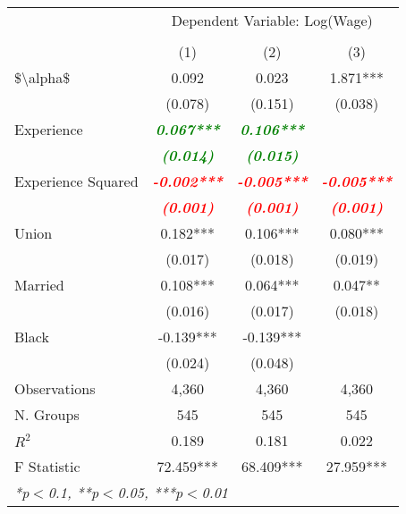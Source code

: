 

\begin{table}[!ht]
  \centering
\begin{tabular}{lccc}
  \toprule
  \toprule
  & \multicolumn{3}{c}{Dependent Variable: Log(Wage)} \\
  \cmidrule(lr){2-4} \\
   &   (1) & (2) & (3)\\
  \midrule
  \$\textbackslash alpha\$ & 0.092 & 0.023 & 1.871*** \\
   & (0.078) & (0.151) & (0.038) \\
  Experience & \textbf{\textit{\textcolor{green}{ 0.067***}}} & \textbf{\textit{\textcolor{green}{ 0.106***}}} &  \\
   & \textbf{\textit{\textcolor{green}{(0.014)}}} & \textbf{\textit{\textcolor{green}{(0.015)}}} &  \\
  Experience Squared & \textbf{\textit{\textcolor{red}{-0.002***}}} & \textbf{\textit{\textcolor{red}{-0.005***}}} & \textbf{\textit{\textcolor{red}{-0.005***}}} \\
   & \textbf{\textit{\textcolor{red}{(0.001)}}} & \textbf{\textit{\textcolor{red}{(0.001)}}} & \textbf{\textit{\textcolor{red}{(0.001)}}} \\
  Union & 0.182*** & 0.106*** & 0.080*** \\
   & (0.017) & (0.018) & (0.019) \\
  Married & 0.108*** & 0.064*** & 0.047** \\
   & (0.016) & (0.017) & (0.018) \\
  Black & -0.139*** & -0.139*** &  \\
   & (0.024) & (0.048) &  \\
  \midrule
  Observations & 4,360 & 4,360 & 4,360 \\
  N. Groups & 545 & 545 & 545 \\
  $R^2$ & 0.189 & 0.181 & 0.022 \\
  F Statistic & 72.459*** & 68.409*** & 27.959*** \\
  \bottomrule
  \multicolumn{4}{l}{{\small \textit{*p$<$0.1, **p$<$0.05, ***p$<$0.01}}}\\
\end{tabular}
\end{table}
